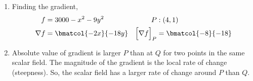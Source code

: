 \begin{enumerate}
    \item Finding the gradient,
          \begin{align}
              f                      & = 3000 - x^2 - 9y^2   &
              P                      & : (4, 1)                \\
              \nabla f               & = \bmatcol{-2x}{-18y} &
              \Big[ \nabla f \Big]_P & = \bmatcol{-8}{-18}
          \end{align}

    \item Absolute value of gradient is larger $ P $ than at $ Q $ for two points in the
    same scalar field. The magnitude of the gradient is the local rate of change
    (steepness). So, the scalar field has a larger rate of change around $ P $ than
    $ Q $.
\end{enumerate}